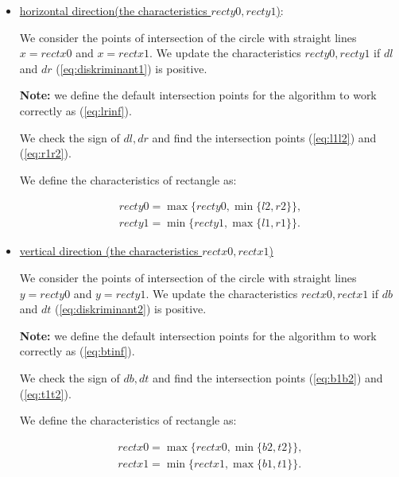 \documentclass{report}
\begin{document}
\begin{itemize}
	
	\item \underline {horizontal direction(the characteristics $recty0, recty1$)}:
	
	We consider the points of intersection of the circle with straight lines $x = rectx0$ and $x = rectx1$. We update the characteristics $recty0, recty1$ if $dl$ and $dr$ (\ref{eq:diskriminant1}) is positive.
	
	{\bfseries Note:} we define the default intersection points for the algorithm to work correctly as (\ref{eq:lrinf}).
	
	We check the sign of $dl, dr$ and find the intersection points (\ref{eq:l1l2}) and (\ref{eq:r1r2}).
	
	We define the characteristics of rectangle as:
	
	\begin{equation}
		\begin{gathered}
			recty0 = \max\{recty0, \min\{l2, r2\}\},\\
			recty1 = \min\{recty1, \max\{l1, r1\}\}.
		\end{gathered}
	\end{equation}
	
	\item \underline {vertical direction (the characteristics $rectx0, rectx1$) }
	
	We consider the points of intersection of the circle with straight lines $y = recty0$ and $y = recty1$.  We update the characteristics $rectx0, rectx1$ if $db$ and  $dt$ (\ref{eq:diskriminant2}) is positive.
	
	{\bfseries Note:} we define the default intersection points for the algorithm to work correctly as (\ref{eq:btinf}).
	
	We check the sign of $db, dt$ and find the intersection points (\ref{eq:b1b2}) and (\ref{eq:t1t2}).
	
	We define the characteristics of rectangle as:
	
	\begin{equation}
		\begin{gathered}
			rectx0 = \max\{rectx0, \min\{b2, t2\}\},\\
			rectx1 = \min\{rectx1, \max\{b1, t1\}\}.
		\end{gathered}
	\end{equation}
	
\end{itemize}	
\end{document}
